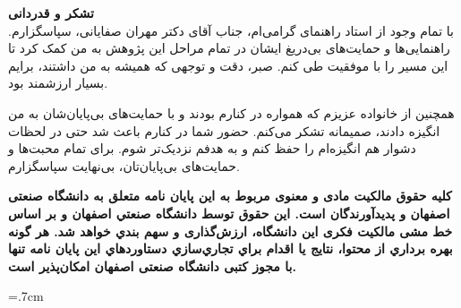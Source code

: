 \thispagestyle{empty}
\vspace*{1.5cm}

{\large
	\textbf{تشکر و قدردانی}\\
	
	
	با تمام وجود از استاد راهنمای گرامی‌ام، جناب آقای دکتر مهران صفایانی، سپاسگزارم. راهنمایی‌ها و حمایت‌های بی‌دریغ ایشان در تمام مراحل این پژوهش به من کمک کرد تا این مسیر را با موفقیت طی کنم. صبر، دقت و توجهی که همیشه به من داشتند، برایم بسیار ارزشمند بود.
	
	همچنین از خانواده عزیزم که همواره در کنارم بودند و با حمایت‌های بی‌پایان‌شان به من انگیزه دادند، صمیمانه تشکر می‌کنم. حضور شما در کنارم باعث شد حتی در لحظات دشوار هم انگیزه‌ام را حفظ کنم و به هدفم نزدیک‌تر شوم. برای تمام محبت‌ها و حمایت‌های بی‌پایان‌تان، بی‌نهایت سپاسگزارم.
	
}
\restoregeometry
\pagebreak

\thispagestyle{empty}

\begin{spacing}{3}
	\leavevmode
	\vfill
	\parbox{8 cm}{
		
		\textbf{\Large کلیه حقوق مالکیت مادی و معنوی مربوط به اين پايان نامه متعلق به دانشگاه صنعتی اصفهان و پدیدآورندگان است. این حقوق توسط دانشگاه صنعتي اصفهان و بر اساس خط مشی مالکیت فکری این دانشگاه، ارزش‌گذاری و سهم بندي خواهد شد.
			هر گونه بهره برداري از محتوا، نتايج یا اقدام براي تجاري‌سازي دستاوردهاي اين پايان نامه تنها با مجوز کتبی دانشگاه صنعتی اصفهان امکان‌پذیر است.
			}
		
	}
	\vfill
\end{spacing}
\restoregeometry
\pagebreak


	


\baselineskip=.7cm

